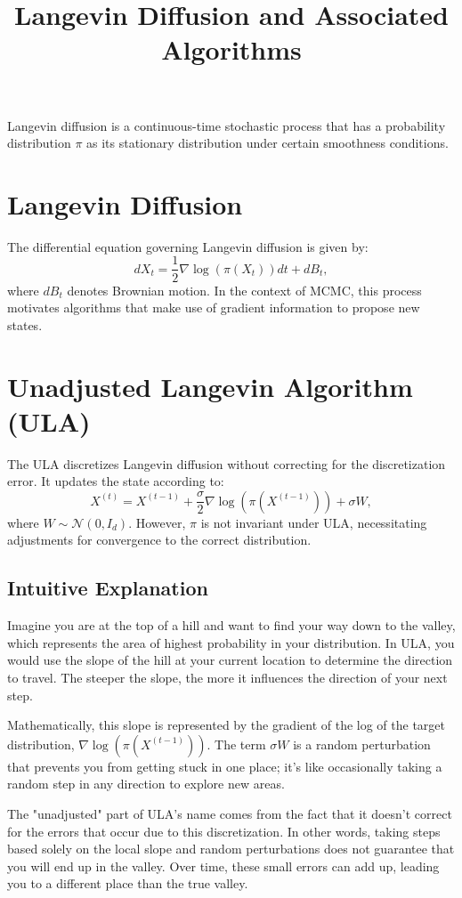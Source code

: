 \documentclass{article}
\title{Langevin Diffusion and Associated Algorithms}
\author{}
\date{}
\begin{document}
\maketitle
Langevin diffusion is a continuous-time stochastic process that has a probability distribution \(\pi\) as its stationary distribution under certain smoothness conditions.

\section{Langevin Diffusion}
The differential equation governing Langevin diffusion is given by:
\[
dX_t = \frac{1}{2} \nabla \log(\pi(X_t))dt + dB_t,
\]
where \(dB_t\) denotes Brownian motion. In the context of MCMC, this process motivates algorithms that make use of gradient information to propose new states.

\section{Unadjusted Langevin Algorithm (ULA)}
The ULA discretizes Langevin diffusion without correcting for the discretization error. It updates the state according to:
\[
X^{(t)} = X^{(t-1)} + \frac{\sigma}{2} \nabla \log(\pi(X^{(t-1)})) + \sigma W,
\]
where \(W \sim \mathcal{N}(0, I_d)\). However, \(\pi\) is not invariant under ULA, necessitating adjustments for convergence to the correct distribution.
\subsection{Intuitive Explanation}
Imagine you are at the top of a hill and want to find your way down to the valley, which represents the area of highest probability in your distribution. In ULA, you would use the slope of the hill at your current location to determine the direction to travel. The steeper the slope, the more it influences the direction of your next step.

Mathematically, this slope is represented by the gradient of the log of the target distribution, \(\nabla \log(\pi(X^{(t-1)}))\). The term \(\sigma W\) is a random perturbation that prevents you from getting stuck in one place; it's like occasionally taking a random step in any direction to explore new areas.

The "unadjusted" part of ULA's name comes from the fact that it doesn't correct for the errors that occur due to this discretization. In other words, taking steps based solely on the local slope and random perturbations does not guarantee that you will end up in the valley. Over time, these small errors can add up, leading you to a different place than the true valley.
\end{document}
